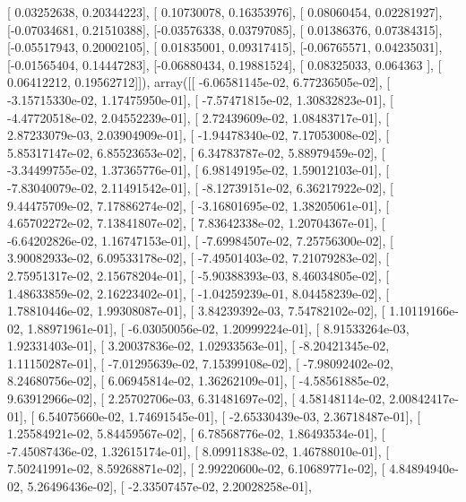 \documentclass{article}
\begin{document}
       [ 0.03252638,  0.20344223],
       [ 0.10730078,  0.16353976],
       [ 0.08060454,  0.02281927],
       [-0.07034681,  0.21510388],
       [-0.03576338,  0.03797085],
       [ 0.01386376,  0.07384315],
       [-0.05517943,  0.20002105],
       [ 0.01835001,  0.09317415],
       [-0.06765571,  0.04235031],
       [-0.01565404,  0.14447283],
       [-0.06880434,  0.19881524],
       [ 0.08325033,  0.064363  ],
       [ 0.06412212,  0.19562712]]), array([[ -6.06581145e-02,   6.77236505e-02],
       [ -3.15715330e-02,   1.17475950e-01],
       [ -7.57471815e-02,   1.30832823e-01],
       [ -4.47720518e-02,   2.04552239e-01],
       [  2.72439609e-02,   1.08483717e-01],
       [  2.87233079e-03,   2.03904909e-01],
       [ -1.94478340e-02,   7.17053008e-02],
       [  5.85317147e-02,   6.85523653e-02],
       [  6.34783787e-02,   5.88979459e-02],
       [ -3.34499755e-02,   1.37365776e-01],
       [  6.98149195e-02,   1.59012103e-01],
       [ -7.83040079e-02,   2.11491542e-01],
       [ -8.12739151e-02,   6.36217922e-02],
       [  9.44475709e-02,   7.17886274e-02],
       [ -3.16801695e-02,   1.38205061e-01],
       [  4.65702272e-02,   7.13841807e-02],
       [  7.83642338e-02,   1.20704367e-01],
       [ -6.64202826e-02,   1.16747153e-01],
       [ -7.69984507e-02,   7.25756300e-02],
       [  3.90082933e-02,   6.09533178e-02],
       [ -7.49501403e-02,   7.21079283e-02],
       [  2.75951317e-02,   2.15678204e-01],
       [ -5.90388393e-03,   8.46034805e-02],
       [  1.48633859e-02,   2.16223402e-01],
       [ -1.04259239e-01,   8.04458239e-02],
       [  1.78810446e-02,   1.99308087e-01],
       [  3.84239392e-03,   7.54782102e-02],
       [  1.10119166e-02,   1.88971961e-01],
       [ -6.03050056e-02,   1.20999224e-01],
       [  8.91533264e-03,   1.92331403e-01],
       [  3.20037836e-02,   1.02933563e-01],
       [ -8.20421345e-02,   1.11150287e-01],
       [ -7.01295639e-02,   7.15399108e-02],
       [ -7.98092402e-02,   8.24680756e-02],
       [  6.06945814e-02,   1.36262109e-01],
       [ -4.58561885e-02,   9.63912966e-02],
       [  2.25702706e-03,   6.31481697e-02],
       [  4.58148114e-02,   2.00842417e-01],
       [  6.54075660e-02,   1.74691545e-01],
       [ -2.65330439e-03,   2.36718487e-01],
       [  1.25584921e-02,   5.84459567e-02],
       [  6.78568776e-02,   1.86493534e-01],
       [ -7.45087436e-02,   1.32615174e-01],
       [  8.09911838e-02,   1.46788010e-01],
       [  7.50241991e-02,   8.59268871e-02],
       [  2.99220600e-02,   6.10689771e-02],
       [  4.84894940e-02,   5.26496436e-02],
       [ -2.33507457e-02,   2.20028258e-01],
\end{document}
